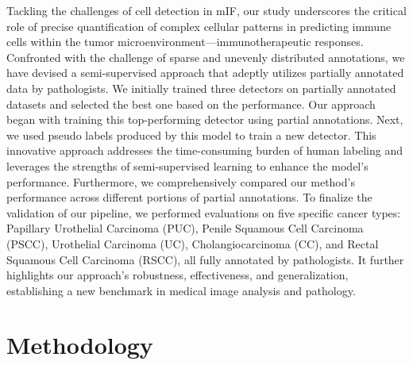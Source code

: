 \documentclass{midl} %
\begin{document}
Tackling the challenges of cell detection in mIF, our study underscores the critical role of precise quantification of complex cellular patterns in predicting immune cells within the tumor microenvironment—immunotherapeutic responses. Confronted with the challenge of sparse and unevenly distributed annotations, we have devised a semi-supervised approach that adeptly utilizes partially annotated data by pathologists. We initially trained three detectors on partially annotated datasets and selected the best one based on the performance. Our approach began with training this top-performing detector using partial annotations. Next, we used pseudo labels produced by this model to train a new detector. This innovative approach addresses the time-consuming burden of human labeling and leverages the strengths of semi-supervised learning to enhance the model's performance. Furthermore, we comprehensively compared our method's performance across different portions of partial annotations. To finalize the validation of our pipeline, we performed evaluations on five specific cancer types: Papillary Urothelial Carcinoma (PUC), Penile Squamous Cell Carcinoma (PSCC), Urothelial Carcinoma (UC), Cholangiocarcinoma (CC), and Rectal Squamous Cell Carcinoma (RSCC), all fully annotated by pathologists. It further highlights our approach's robustness, effectiveness, and generalization, establishing a new benchmark in medical image analysis and pathology.

\section{Methodology}
\label{sec:methodology}
\end{document}
